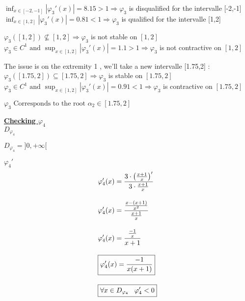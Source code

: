 \(\displaystyle\inf_{x \in [-2,-1]} |\varphi_3'(x)| = 8.15 > 1 \Longrightarrow \varphi_3\) is disqualified 
for the intervalle [-2,-1]\\[0.15cm]
\(\displaystyle\inf_{x \in [1,2]} |\varphi_3'(x)| = 0.81 < 1 \Longrightarrow \varphi_3\) is qualified 
for the intervalle [1,2]

\vspace{0.5cm}
\(\varphi_3([1,2]) \nsubseteq [1,2] \Longrightarrow \varphi_3\) is not stable on \([1,2]\)\\[0.1cm]
\( \varphi_3 \in C^{1} \text{ and } \displaystyle\sup_{x \in [1, 2]} |\varphi_3'(x)| = 1.1 > 1 \Longrightarrow \varphi_3\) is not contractive on \([1,2]\)

\vspace{0.5cm}
The issue is on the extremity 1 , we'll take a new intervalle [1.75,2] :\\[0.15cm]
\(\varphi_3([1.75,2]) \subseteq [1.75,2] \Longrightarrow \varphi_3\) is stable on \([1.75,2]\)\\[0.1cm]
\( \varphi_3 \in C^{1} \text{ and } \displaystyle\sup_{x \in [1, 2]} |\varphi_3'(x)| = 0.91 < 1 \Longrightarrow \varphi_3\) is contractive on \([1.75,2]\)


\begin{center}
    \(\boxed{\varphi_3 \text{ Corresponds to the root } \alpha_2 \in [1.75,2]}\)
\end{center}

\vspace{1cm}

\textbf{\underline{Checking \(\varphi_4\)}}\\[0.15cm]
\textbf{\underline{\(D_{\varphi_4}\)}}
\begin{center}
    \( \boxed{D_{\varphi_4} = ]0,+\infty[}\)
\end{center}

\textbf{\underline{\(\varphi_4'\)}}
\begin{align*}
    &\varphi_4'(x) = \dfrac{3\cdot \left(\frac{x+1}{x}\right)'}{3 \cdot \frac{x+1}{x}}\\[0.35cm]
    &\varphi_4'(x) = \dfrac{\frac{x - (x+1)}{x^2} }{\frac{x+1}{x}}\\[0.35cm]
    &\varphi_4'(x) = \dfrac{\frac{-1}{x}}{x+1}\\[0.35cm]
    &\boxed{\varphi_4'(x) = \dfrac{-1}{x(x+1)}}\\[0.35cm]
    &\boxed{\forall x \in D_{\varphi_4} \hspace{0.3cm} \varphi_4' < 0}
\end{align*}

